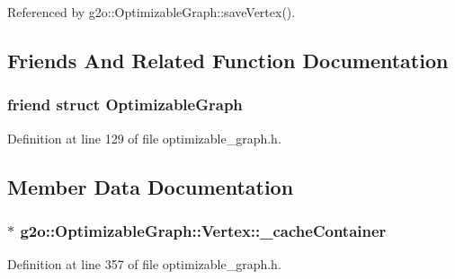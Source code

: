 Referenced by g2o\+::\+Optimizable\+Graph\+::save\+Vertex().



\subsection{Friends And Related Function Documentation}
\subsubsection[{\texorpdfstring{Optimizable\+Graph}{OptimizableGraph}}]{\setlength{\rightskip}{0pt plus 5cm}friend struct {\bf Optimizable\+Graph}\hspace{0.3cm}{\ttfamily [friend]}}\hypertarget{classg2o_1_1OptimizableGraph_1_1Vertex_a45d35331ee3deca38c26d1efb6b961ae}{}\label{classg2o_1_1OptimizableGraph_1_1Vertex_a45d35331ee3deca38c26d1efb6b961ae}


Definition at line 129 of file optimizable\+\_\+graph.\+h.



\subsection{Member Data Documentation}
\subsubsection[{\texorpdfstring{\+\_\+cache\+Container}{_cacheContainer}}]{$\ast$ g2o\+::\+Optimizable\+Graph\+::\+Vertex\+::\+\_\+cache\+Container\hspace{0.3cm}{\ttfamily [protected]}}\hypertarget{classg2o_1_1OptimizableGraph_1_1Vertex_a6eed5b850221cd76f0af46b97860f2e8}{}\label{classg2o_1_1OptimizableGraph_1_1Vertex_a6eed5b850221cd76f0af46b97860f2e8}


Definition at line 357 of file optimizable\+\_\+graph.\+h.



